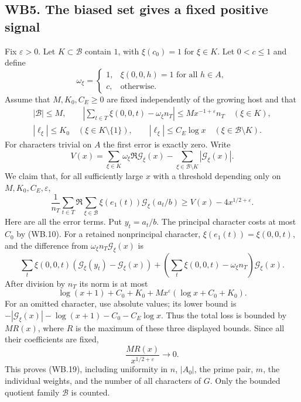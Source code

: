 \subsection{WB5. The biased set gives a fixed positive signal}

Fix $\varepsilon>0$. Let $K\subset\mathcal B$ contain $1$, with $\xi(c_0)=1$ for
$\xi\in K$. Let $0<c\le1$ and define
\[
 \omega_\xi=\begin{cases}1,&\xi(0,0,h)=1\text{ for all }h\in A,\\
                         c,&\text{otherwise}.
              \end{cases}
\]
Assume that $M,K_0,C_E\ge0$ are fixed independently of the growing
host and that
\begin{gather*}
 |\mathcal B|\le M,\qquad
 \left|\sum_{t\in T}\xi(0,0,t)-\omega_\xi n_T\right|
       \le Mx^{-1+\varepsilon}n_T\quad(\xi\in K),\\
 |\ell_\xi|\le K_0\quad(\xi\in K\setminus\{1\}),\qquad
 |\ell_\xi|\le C_E\log x\quad(\xi\in\mathcal B\setminus K).
 \tag{WB.17}
\end{gather*}
For characters trivial on $A$ the first error is exactly zero.
Write
\[
 V(x)=\sum_{\xi\in K}\omega_\xi\Re\mathcal G_\xi(x)
                    -\sum_{\xi\in\mathcal B\setminus K}
                                      |\mathcal G_\xi(x)|.
 \tag{WB.18}
\]
We claim that, for all sufficiently large $x$ with a threshold depending
only on $M,K_0,C_E,\varepsilon$,
\[
 \frac1{n_T}\sum_{t\in T}\Re\sum_{\xi\in\mathcal B}
       \xi(e_1(t))\mathcal G_\xi(a_t/b)
 \ge V(x)-4x^{1/2+\varepsilon}.
 \tag{WB.19}
\]
Here are all the error terms. Put $y_t=a_t/b$. The principal character
costs at most $C_0$ by (WB.10). For a retained nonprincipal character,
$\xi(e_1(t))=\xi(0,0,t)$, and the difference from
$\omega_\xi n_T\mathcal G_\xi(x)$ is
\[
 \sum_t\xi(0,0,t)(\mathcal G_\xi(y_t)-\mathcal G_\xi(x))
 +\left(\sum_t\xi(0,0,t)-\omega_\xi n_T\right)
                                                   \mathcal G_\xi(x).
\]
After division by $n_T$ its norm is at most
\[
 \log(x+1)+C_0+K_0
       +Mx^\varepsilon(\log x+C_0+K_0).
\]
For an omitted character, use absolute values; its lower bound is
$-|\mathcal G_\xi(x)|-\log(x+1)-C_0-C_E\log x$.
Thus the total loss is bounded by $MR(x)$, where $R$ is the maximum
of these three displayed bounds. Since all their coefficients are
fixed,
\[
 \frac{MR(x)}{x^{1/2+\varepsilon}}\longrightarrow0.
\]
This proves (WB.19), including uniformity in $n$, $|A_0|$, the prime
pair, $m$, the individual weights, and the number of all characters
of $G$. Only the bounded quotient family $\mathcal B$ is counted.

